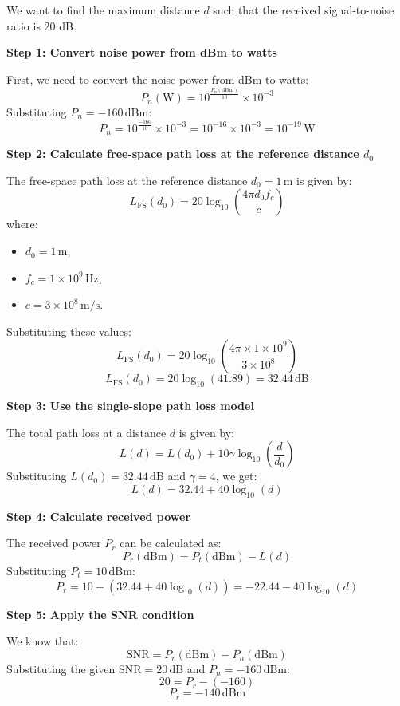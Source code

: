 \documentclass[a4paper,12pt]{book}
\begin{document}
\begin{enumerate}
		We want to find the maximum distance \( d \) such that the received signal-to-noise ratio is 20 dB.
		
		\textbf{Step 1: Convert noise power from dBm to watts}\newline
		
		First, we need to convert the noise power from dBm to watts:
		\[
		P_n (\text{W}) = 10^{\frac{P_n (\text{dBm})}{10}} \times 10^{-3}
		\]
		Substituting \( P_n = -160 \, \text{dBm} \):
		\[
		P_n = 10^{\frac{-160}{10}} \times 10^{-3} = 10^{-16} \times 10^{-3} = 10^{-19} \, \text{W}
		\]
		
		\textbf{Step 2: Calculate free-space path loss at the reference distance \( d_0 \)}\newline
		
		The free-space path loss at the reference distance \( d_0 = 1 \, \text{m} \) is given by:
		\[
		L_{\text{FS}}(d_0) = 20 \log_{10} \left( \frac{4\pi d_0 f_c}{c} \right)
		\]
		where:
		\begin{itemize}
			\item \( d_0 = 1 \, \text{m} \),
			\item \( f_c = 1 \times 10^9 \, \text{Hz} \),
			\item \( c = 3 \times 10^8 \, \text{m/s} \).
		\end{itemize}
		
		Substituting these values:
		\[
		L_{\text{FS}}(d_0) = 20 \log_{10} \left( \frac{4 \pi \times 1 \times 10^9}{3 \times 10^8} \right)
		\]
		\[
		L_{\text{FS}}(d_0) = 20 \log_{10}(41.89) = 32.44 \, \text{dB}
		\]
		
		\textbf{Step 3: Use the single-slope path loss model}\newline
		
		The total path loss at a distance \( d \) is given by:
		\[
		L(d) = L(d_0) + 10 \gamma \log_{10} \left( \frac{d}{d_0} \right)
		\]
		Substituting \( L(d_0) = 32.44 \, \text{dB} \) and \( \gamma = 4 \), we get:
		\[
		L(d) = 32.44 + 40 \log_{10}(d)
		\]
		
		\textbf{Step 4: Calculate received power}
		
		The received power \( P_r \) can be calculated as:
		\[
		P_r (\text{dBm}) = P_t (\text{dBm}) - L(d)
		\]
		Substituting \( P_t = 10 \, \text{dBm} \):
		\[
		P_r = 10 - (32.44 + 40 \log_{10}(d)) = -22.44 - 40 \log_{10}(d)
		\]
		
		\textbf{Step 5: Apply the SNR condition}
		
		We know that:
		\[
		\text{SNR} = P_r (\text{dBm}) - P_n (\text{dBm})
		\]
		Substituting the given \( \text{SNR} = 20 \, \text{dB} \) and \( P_n = -160 \, \text{dBm} \):
		\[
		20 = P_r - (-160)
		\]
		\[
		P_r = -140 \, \text{dBm}
		\]
		

\end{enumerate}
\end{document}
